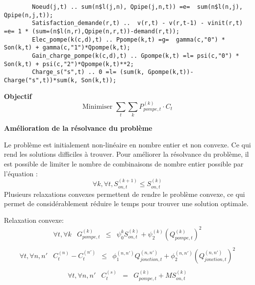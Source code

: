 \documentclass{article}
\begin{document}
\begin{adjustbox}{max width=\textwidth}
    \begin{lstlisting}
        Noeud(j,t) .. sum(n$l(j,n), Qpipe(j,n,t)) =e=  sum(n$l(n,j), Qpipe(n,j,t));
        Satisfaction_demande(r,t) ..  v(r,t) - v(r,t-1) - vinit(r,t) =e= 1 * (sum=(n$l(n,r),Qpipe(n,r,t))-demand(r,t));
        Elec_pompe(k(c,d),t) .. Ppompe(k,t) =g=  gamma(c,"0") * Son(k,t) + gamma(c,"1")*Qpompe(k,t);
        Gain_charge_pompe(k(c,d),t) .. Gpompe(k,t) =l= psi(c,"0") * Son(k,t) + psi(c,"2")*Qpompe(k,t)**2;
        Charge_s("s",t) .. 0 =l= (sum(k, Gpompe(k,t))-Charge("s",t))*sum(k, Son(k,t));
    \end{lstlisting}
\end{adjustbox}
\clearpage
\textbf{Objectif}
$$
    \text{Minimiser }   \sum_t \sum_k P_{pompe,t}^{(k)}\cdot C_t
$$

\textbf{Amélioration de la résolvance du problème}
\begin{multicols}{2}
    Le problème est initialement non-linéaire en nombre entier et non convexe. Ce qui rend les solutions difficiles à trouver. Pour améliorer la résolvance du problème, il est possible de limiter le nombre de combinaisons de nombre entier possible par l'équation :
    \begin{equation}
        \tag{Symétrie}
        \forall k, \forall t, S_{on,t}^{(k+1)}\leq S_{on,t}^{(k)}
    \end{equation}
    Plusieurs relaxations convexes permettent de rendre le problème convexe, ce qui permet de considérablement réduire le temps pour trouver une solution optimale.
\end{multicols}
Relaxation convexe:
\begin{equation}
    \tag{Gain charge pompe relax.}
    \left.
        \begin{array}{lccc}
            \forall t, \forall k   &   G_{pompe,t}^{(k)}     & \leq &   \psi_0^{k}S_{on,t}^{(k)} + \psi_2^{(k)}(Q_{pompe,t}^{(k)})^2\\[0.2cm]
        \end{array}
    \right.
\end{equation}
\begin{equation}
    \tag{Perte charge flux relax.}
    \left.
        \begin{array}{lcccc}
            \forall t, \forall n,n'   &   C_t^{(n)}  - C_t^{(n')}    & \leq &   \phi_1^{(n,n')}Q_{jonction,t}^{(n,n')} + \phi_2^{(n,n')}(Q_{jonction,t}^{(n,n')})^2\\[0.2cm]
        \end{array}
    \right.
\end{equation}
\begin{equation}
    \tag{Charge source relax.}
    \left.
        \begin{array}{lcccc}
            \forall t, \forall n,n'   &   C_t^{(s)} & = & G_{pompe,t}^{(k)} + M S_{on,t}^{(k)}\\[0.2cm]
        \end{array}
    \right.
\end{equation}
\end{document}
